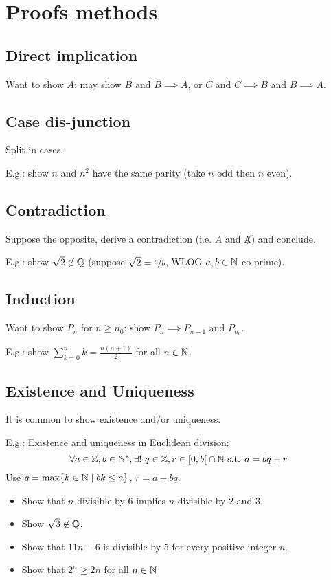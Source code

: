 \chapter{Proofs methods}

\section{Direct implication}
Want to show $A$: may show $B$ and $B \implies A$, or $C$ and $C \implies B$ and $B \implies A$.

\section{Case dis-junction}
Split in cases.

E.g.: show $n$ and $n^2$ have the same parity (take $n$ odd then $n$ even).

\section{Contradiction}
Suppose the opposite, derive a contradiction (i.e. $A$ and $\not A$) and conclude.

E.g.: show $\sqrt{2} \not\in \mathbb{Q}$ (suppose $\sqrt{2}=\nicefrac{a}{b}$, WLOG $a,b \in \mathbb{N}$ co-prime).

\section{Induction}
Want to show $P_n$ for $n \geq n_0$: show $P_n \implies P_{n+1}$ and $P_{n_0}$.

E.g.: show $\sum_{k=0}^{n} k = \frac{n(n+1)}{2}$ for all $n \in \mathbb{N}$.

\section{Existence and Uniqueness}
It is common to show existence and/or uniqueness.

E.g.: Existence and uniqueness in Euclidean division: 
$$\forall a \in \mathbb{Z}, b \in \mathbb{N}^*, \exists ! \ q \in \mathbb{Z}, r \in \left[ 0, b \right[ \cap \mathbb{N} \text{ s.t. } a=bq+r$$
Use $q = \max\{ k \in \mathbb{N} \mid bk \leq a \}$, $r = a-bq$.

\begin{question}
	\begin{itemize}
		\item Show that $n$ divisible by 6 implies $n$ divisible by 2 and 3.
		\item Show $\sqrt{3} \not\in \mathbb{Q}$.
		\item Show that $11n-6$ is divisible by 5 for every positive integer $n$.
		\item Show that $2^n \geq 2n$ for all $n \in \mathbb{N}$
	\end{itemize}
\end{question}